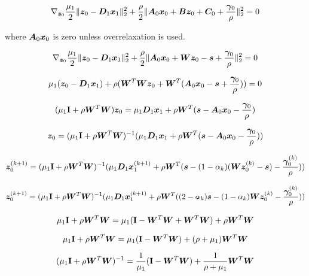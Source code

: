 \begin{equation}
\nabla_{\bm{z}_0} \frac{\mu_1}{2}\|\bm{z}_0 - \bm{D}_1\bm{x}_1\|_2^2 + \frac{\rho}{2}\|\bm{A}_0\bm{x}_0 + \bm{B}\bm{z}_0 + \bm{C}_0 + \frac{\bm{\gamma}_0}{\rho}\|_2^2 = 0
\end{equation}

where $\bm{A}_0\bm{x}_0$ is zero unless overrelaxation is used.

\begin{equation}
\nabla_{\bm{z}_0} \frac{\mu_1}{2}\|\bm{z}_0 - \bm{D}_1\bm{x}_1\|_2^2 + \frac{\rho}{2}\|\bm{A}_0\bm{x}_0 + \bm{W}\bm{z}_0 - \bm{s} + \frac{\bm{\gamma}_0}{\rho}\|_2^2 = 0
\end{equation}

\begin{equation}
\mu_1(\bm{z}_0 - \bm{D}_1\bm{x}_1) + \rho(\bm{W}^T\bm{W}\bm{z}_0 + \bm{W}^T(\bm{A}_0\bm{x}_0 - \bm{s} + \frac{\bm{\gamma}_0}{\rho})) = 0
\end{equation}

\begin{equation}
(\mu_1{\bf I} + \rho\bm{W}^T\bm{W})\bm{z}_0 = \mu_1\bm{D}_1\bm{x}_1 + \rho\bm{W}^T(\bm{s} - \bm{A}_0\bm{x}_0 - \frac{\bm{\gamma}_0}{\rho})
\end{equation}

\begin{equation}
\bm{z}_0 = (\mu_1{\bf I} + \rho\bm{W}^T\bm{W})^{-1}(\mu_1\bm{D}_1\bm{x}_1 + \rho\bm{W}^T(\bm{s} - \bm{A}_0\bm{x}_0 - \frac{\bm{\gamma}_0}{\rho}))
\end{equation}

\begin{equation}
\bm{z}_0^{(k + 1)} = (\mu_1{\bf I} + \rho\bm{W}^T\bm{W})^{-1}(\mu_1\bm{D}_1\bm{x}_1^{(k + 1)} + \rho\bm{W}^T(\bm{s} - (1 - \alpha_k)(\bm{W}\bm{z}_0^{(k)} - \bm{s}) - \frac{\bm{\gamma}_0^{(k)}}{\rho}))
\end{equation}

\begin{equation}
\bm{z}_0^{(k + 1)} = (\mu_1{\bf I} + \rho\bm{W}^T\bm{W})^{-1}(\mu_1\bm{D}_1\bm{x}_1^{(k + 1)} + \rho\bm{W}^T((2 - \alpha_k)\bm{s} - (1 - \alpha_k)\bm{W}\bm{z}_0^{(k)} - \frac{\bm{\gamma}_0^{(k)}}{\rho}))
\end{equation}

\begin{equation}
\mu_1{\bf I} + \rho\bm{W}^T\bm{W} = \mu_1({\bf I} - \bm{W}^T\bm{W} + \bm{W}^T\bm{W}) + \rho\bm{W}^T\bm{W} 
\end{equation}

\begin{equation}
\mu_1{\bf I} + \rho\bm{W}^T\bm{W} = \mu_1({\bf I} - \bm{W}^T\bm{W}) + (\rho + \mu_1)\bm{W}^T\bm{W} 
\end{equation}

\begin{equation}
(\mu_1{\bf I} + \rho\bm{W}^T\bm{W})^{-1} = \frac{1}{\mu_1}({\bf I} - \bm{W}^T\bm{W}) + \frac{1}{\rho + \mu_1}\bm{W}^T\bm{W} 
\end{equation}

